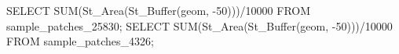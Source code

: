 \lstset{caption=Consulta SQL para la métrica TCA.,label= IDW1}
\begin{SQL}
SELECT SUM(St_Area(St_Buffer(geom, -50)))/10000 FROM sample_patches_25830;
SELECT SUM(St_Area(St_Buffer(geom, -50)))/10000 FROM sample_patches_4326;
\end{SQL}
